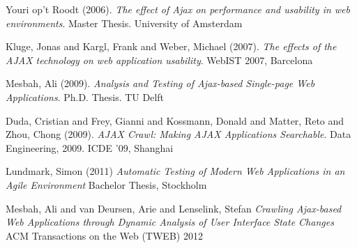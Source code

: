 \documentclass[f,bachelor,binding,twoside,palatino]{WeSTthesis}
\begin{document}
\begin{thebibliography}{9}

  Youri op't Roodt (2006).
  \emph{The effect of Ajax on performance and usability in web environments}.
  Master Thesis. University of Amsterdam

  Kluge, Jonas and Kargl, Frank and Weber, Michael (2007).
  \emph{The effects of the AJAX technology on web application usability}.
  WebIST 2007, Barcelona

  Mesbah, Ali (2009).
  \emph{Analysis and Testing of Ajax-based Single-page Web Applications}.
  Ph.D. Thesis. TU Delft

  Duda, Cristian and Frey, Gianni and Kossmann, Donald and Matter, Reto and Zhou, Chong (2009).
  \emph{AJAX Crawl: Making AJAX Applications Searchable}.
  Data Engineering, 2009. ICDE '09, Shanghai
  
  Lundmark, Simon (2011)
  \emph{Automatic Testing of Modern Web Applications in an Agile Environment}
  Bachelor Thesis, Stockholm

  Mesbah, Ali and van Deursen, Arie and Lenselink, Stefan
  \emph{Crawling {Ajax}-based Web Applications through Dynamic Analysis of User Interface State Changes}
  ACM Transactions on the Web (TWEB) 2012
  
\end{thebibliography}

\printglossary
\end{document}

